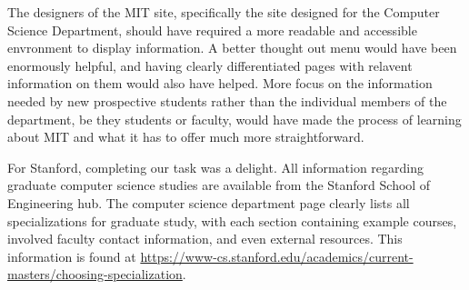 The designers of the MIT site, specifically the site designed for the Computer Science Department,
should have required a more readable and accessible envronment to display information. A better
thought out menu would have been enormously helpful, and having clearly differentiated pages with
relavent information on them would also have helped. More focus on the information needed by new
prospective students rather than the individual members of the department, be they students or
faculty, would have made the process of learning about MIT and what it has to offer much more
straightforward.

For Stanford, completing our task was a delight. All information regarding
graduate computer science studies are available from the Stanford School of
Engineering hub. The computer science department page clearly lists
all specializations for graduate study, with each section containing example
courses, involved faculty contact information, and even external resources. This
information is found at
\url{https://www-cs.stanford.edu/academics/current-masters/choosing-specialization}.

